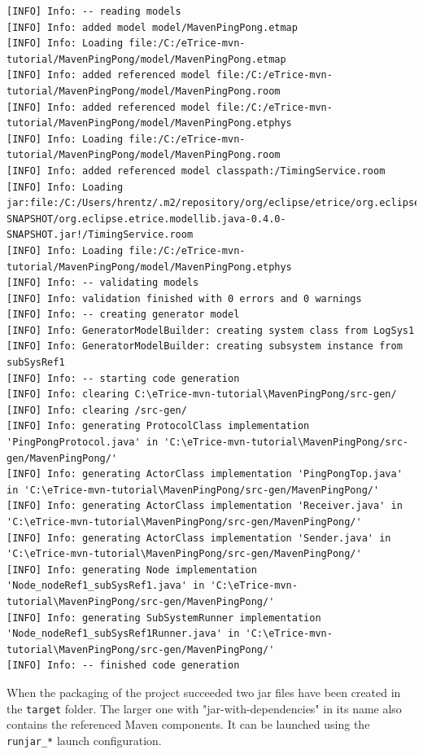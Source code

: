 \begin{lstlisting}[language=PlainText]
[INFO] Info: -- reading models
[INFO] Info: added model model/MavenPingPong.etmap
[INFO] Info: Loading file:/C:/eTrice-mvn-tutorial/MavenPingPong/model/MavenPingPong.etmap
[INFO] Info: added referenced model file:/C:/eTrice-mvn-tutorial/MavenPingPong/model/MavenPingPong.room
[INFO] Info: added referenced model file:/C:/eTrice-mvn-tutorial/MavenPingPong/model/MavenPingPong.etphys
[INFO] Info: Loading file:/C:/eTrice-mvn-tutorial/MavenPingPong/model/MavenPingPong.room
[INFO] Info: added referenced model classpath:/TimingService.room
[INFO] Info: Loading jar:file:/C:/Users/hrentz/.m2/repository/org/eclipse/etrice/org.eclipse.etrice.modellib.java/0.4.0-SNAPSHOT/org.eclipse.etrice.modellib.java-0.4.0-SNAPSHOT.jar!/TimingService.room
[INFO] Info: Loading file:/C:/eTrice-mvn-tutorial/MavenPingPong/model/MavenPingPong.etphys
[INFO] Info: -- validating models
[INFO] Info: validation finished with 0 errors and 0 warnings
[INFO] Info: -- creating generator model
[INFO] Info: GeneratorModelBuilder: creating system class from LogSys1
[INFO] Info: GeneratorModelBuilder: creating subsystem instance from subSysRef1
[INFO] Info: -- starting code generation
[INFO] Info: clearing C:\eTrice-mvn-tutorial\MavenPingPong/src-gen/
[INFO] Info: clearing /src-gen/
[INFO] Info: generating ProtocolClass implementation 'PingPongProtocol.java' in 'C:\eTrice-mvn-tutorial\MavenPingPong/src-gen/MavenPingPong/'
[INFO] Info: generating ActorClass implementation 'PingPongTop.java' in 'C:\eTrice-mvn-tutorial\MavenPingPong/src-gen/MavenPingPong/'
[INFO] Info: generating ActorClass implementation 'Receiver.java' in 'C:\eTrice-mvn-tutorial\MavenPingPong/src-gen/MavenPingPong/'
[INFO] Info: generating ActorClass implementation 'Sender.java' in 'C:\eTrice-mvn-tutorial\MavenPingPong/src-gen/MavenPingPong/'
[INFO] Info: generating Node implementation 'Node_nodeRef1_subSysRef1.java' in 'C:\eTrice-mvn-tutorial\MavenPingPong/src-gen/MavenPingPong/'
[INFO] Info: generating SubSystemRunner implementation 'Node_nodeRef1_subSysRef1Runner.java' in 'C:\eTrice-mvn-tutorial\MavenPingPong/src-gen/MavenPingPong/'
[INFO] Info: -- finished code generation
\end{lstlisting}

When the packaging of the project succeeded two jar files have been created in the \texttt{target} folder.
The larger one with "jar-with-dependencies" in its name also contains the referenced Maven components. It can be
launched using the \texttt{runjar\_*} launch configuration.

